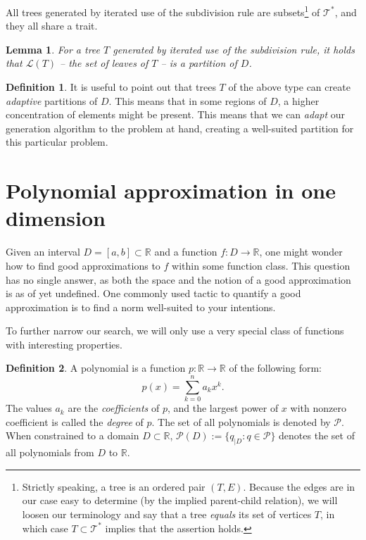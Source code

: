 \documentclass[11pt]{report}
\newtheorem{lemma}{Lemma}
\theoremstyle{definition}
\newtheorem{definition}{Definition}
\theoremstyle{remark}
\newcommand{\R}{\mathbb{R}}
\newcommand{\T}{\mathcal{T}}
\renewcommand{\L}{\mathcal{L}}
\renewcommand{\P}{\mathcal{P}}
\begin{document}
All trees generated by iterated use of the subdivision rule are subsets\footnote{Strictly speaking, a tree is an ordered pair $(T, E)$. Because the edges are in our case easy to determine (by the implied parent-child relation), we will loosen our terminology and say that a tree \emph{equals} its set of vertices $T$, in which case $T \subset \T^*$ implies that the assertion holds.} of $\T^*$, and they all share a trait.
\begin{lemma}
  \label{lem:part}
  For a tree $T$ generated by iterated use of the subdivision rule, it holds that $\L(T)$ -- the set of leaves of $T$ -- is a partition of $D$.
\end{lemma}
\begin{definition}
  It is useful to point out that trees $T$ of the above type can create \emph{adaptive} partitions of $D$. This means that in some regions of $D$, a higher concentration of elements might be present. This means that we can \emph{adapt} our generation algorithm to the problem at hand, creating a well-suited partition for this particular problem.
\end{definition}

\section{Polynomial approximation in one dimension}
\label{sec:polyapprox}
Given an interval $D = [a,b] \subset \R$ and a function $f: D \to \R$, one might wonder how to find good approximations to $f$ within some function class. This question has no single answer, as both the space and the notion of a good approximation is as of yet undefined. One commonly used tactic to quantify a good approximation is to find a norm well-suited to your intentions.

To further narrow our search, we will only use a very special class of functions with interesting properties.
\begin{definition}
  A polynomial is a function $p: \R \to \R$ of the following form:
  \[
    p(x) = \sum_{k=0}^n a_k x^k.
  \]
  The values $a_k$ are the \emph{coefficients} of $p$, and the largest power of $x$ with nonzero coefficient is called the \emph{degree} of $p$. The set of all polynomials is denoted by $\P$. When constrained to a domain $D \subset \R$, $\P(D) := \{ q_{|D}: q \in \P \}$ denotes the set of all polynomials from $D$ to $\R$.
\end{definition}
\end{document}
